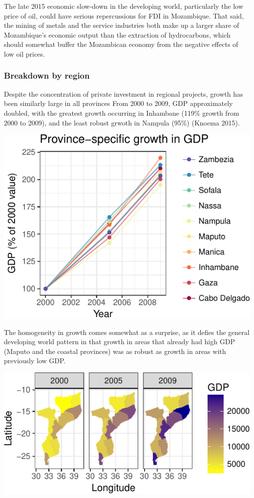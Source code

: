 \documentclass[]{elsarticle} %
\begin{document}
The late 2015 economic slow-down in the developing world, particularly
the low price of oil, could have serious repercussions for FDI in
Mozambique. That said, the mining of metals and the service industries
both make up a larger share of Mozambique's economic output than the
extraction of hydrocarbons, which should somewhat buffer the Mozambican
economy from the negative effects of low oil prices.

\subsubsection{Breakdown by region}\label{breakdown-by-region}

Despite the concentration of private investment in regional projects,
growth has been similarly large in all provinces From 2000 to 2009, GDP
approximately doubled, with the greatest growth occurring in Inhambane
(119\% growth from 2000 to 2009), and the least robust grwoth in Nampula
(95\%) (Knoema 2015).

\begin{center}\includegraphics{paper_files/figure-latex/unnamed-chunk-9-1} \end{center}

The homogeneity in growth comes somewhat as a surprise, as it defies the
general developing world pattern in that growth in areas that already
had high GDP (Maputo and the coastal provinces) was as robust as growth
in areas with previously low GDP.

\begin{center}\includegraphics{paper_files/figure-latex/unnamed-chunk-10-1} \end{center}
\end{document}

